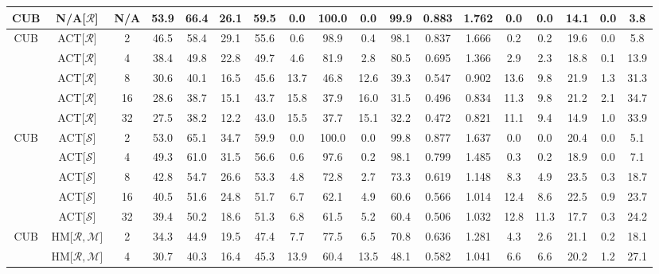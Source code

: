 \begin{table*}
{\begin{tabular}{c|cc|cccc|ccccc|ccccc|c}
CUB & N/A{[}$\mathcal{R}${]} & N/A & 53.9 & 66.4 & 26.1 & 59.5 & 0.0 & 100.0 & 0.0 & 99.9 & 0.883 & 1.762 & 0.0 & 0.0 & 14.1 & 0.0 & 3.8\tabularnewline
\hline
\multirow{5}{*}{CUB} & \textcolor{tab:cyan}{ACT{[}$\mathcal{R}${]}}\cite{robrank} & 2 & 46.5 & 58.4 & 29.1 & 55.6 & 0.6 & 98.9 & 0.4 & 98.1 & 0.837 & 1.666 & 0.2 & 0.2 & 19.6 & 0.0 & 5.8\tabularnewline
\rowcolor{black!7}\cellcolor{white} & \textcolor{tab:cyan}{ACT{[}$\mathcal{R}${]}}\cite{robrank} & 4 & 38.4 & 49.8 & 22.8 & 49.7 & 4.6 & 81.9 & 2.8 & 80.5 & 0.695 & 1.366 & 2.9 & 2.3 & 18.8 & 0.1 & 13.9\tabularnewline
 & \textcolor{tab:cyan}{ACT{[}$\mathcal{R}${]}}\cite{robrank} & 8 & 30.6 & 40.1 & 16.5 & 45.6 & 13.7 & 46.8 & 12.6 & 39.3 & 0.547 & 0.902 & 13.6 & 9.8 & 21.9 & 1.3 & 31.3\tabularnewline
\rowcolor{black!7}\cellcolor{white} & \textcolor{tab:cyan}{ACT{[}$\mathcal{R}${]}}\cite{robrank} & 16 & 28.6 & 38.7 & 15.1 & 43.7 & 15.8 & 37.9 & 16.0 & 31.5 & 0.496 & 0.834 & 11.3 & 9.8 & 21.2 & 2.1 & 34.7\tabularnewline
 & \textcolor{tab:cyan}{ACT{[}$\mathcal{R}${]}}\cite{robrank} & 32 & 27.5 & 38.2 & 12.2 & 43.0 & 15.5 & 37.7 & 15.1 & 32.2 & 0.472 & 0.821 & 11.1 & 9.4 & 14.9 & 1.0 & 33.9\tabularnewline
\hline
\multirow{5}{*}{CUB} & \textcolor{tab:orange}{ACT{[}$\mathcal{S}${]}}\cite{robrank} & 2 & 53.0 & 65.1 & 34.7 & 59.9 & 0.0 & 100.0 & 0.0 & 99.8 & 0.877 & 1.637 & 0.0 & 0.0 & 20.4 & 0.0 & 5.1\tabularnewline
\rowcolor{black!7}\cellcolor{white}& \textcolor{tab:orange}{ACT{[}$\mathcal{S}${]}}\cite{robrank} & 4 & 49.3 & 61.0 & 31.5 & 56.6 & 0.6 & 97.6 & 0.2 & 98.1 & 0.799 & 1.485 & 0.3 & 0.2 & 18.9 & 0.0 & 7.1\tabularnewline
& \textcolor{tab:orange}{ACT{[}$\mathcal{S}${]}}\cite{robrank} & 8 & 42.8 & 54.7 & 26.6 & 53.3 & 4.8 & 72.8 & 2.7 & 73.3 & 0.619 & 1.148 & 8.3 & 4.9 & 23.5 & 0.3 & 18.7\tabularnewline
\rowcolor{black!7}\cellcolor{white}& \textcolor{tab:orange}{ACT{[}$\mathcal{S}${]}}\cite{robrank} & 16 & 40.5 & 51.6 & 24.8 & 51.7 & 6.7 & 62.1 & 4.9 & 60.6 & 0.566 & 1.014 & 12.4 & 8.6 & 22.5 & 0.9 & 23.7\tabularnewline
& \textcolor{tab:orange}{ACT{[}$\mathcal{S}${]}}\cite{robrank} & 32 & 39.4 & 50.2 & 18.6 & 51.3 & 6.8 & 61.5 & 5.2 & 60.4 & 0.506 & 1.032 & 12.8 & 11.3 & 17.7 & 0.3 & 24.2\tabularnewline
\hline
\multirow{5}{*}{CUB} & \textcolor{tab:blue}{HM{[}$\mathcal{R},\mathcal{M}${]}} & 2 & 34.3 & 44.9 & 19.5 & 47.4 & 7.7 & 77.5 & 6.5 & 70.8 & 0.636 & 1.281 & 4.3 & 2.6 & 21.1 & 0.2 & 18.1\tabularnewline
\rowcolor{black!7}\cellcolor{white} & \textcolor{tab:blue}{HM{[}$\mathcal{R},\mathcal{M}${]}} & 4 & 30.7 & 40.3 & 16.4 & 45.3 & 13.9 & 60.4 & 13.5 & 48.1 & 0.582 & 1.041 & 6.6 & 6.6 & 20.2 & 1.2 & 27.1\tabularnewline

\end{tabular}}
\end{table*}
